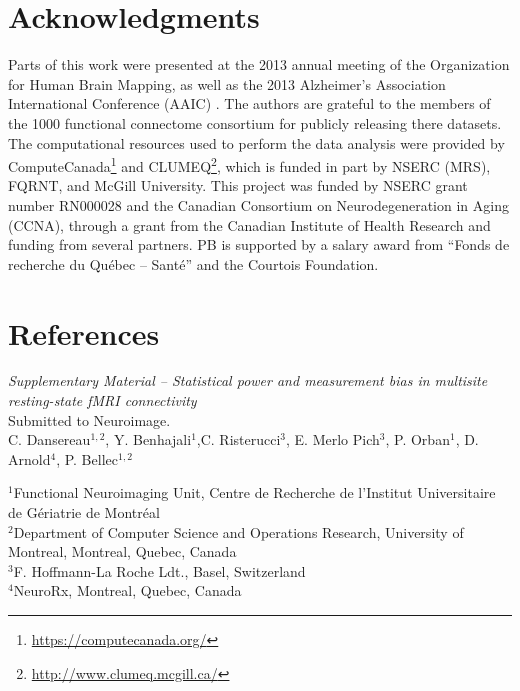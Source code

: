 \documentclass[authoryear]{elsarticle}
\begin{document}
\section{Acknowledgments}
Parts of this work were presented at the 2013 annual meeting of the Organization for Human Brain Mapping, as well as the 2013 Alzheimer's Association International Conference (AAIC) \citep{Dansereau2013b}. The authors are grateful to the members of the 1000 functional connectome consortium for publicly releasing there datasets. The computational resources used to perform the data analysis were provided by ComputeCanada\footnote{\url{https://computecanada.org/}} and CLUMEQ\footnote{\url{http://www.clumeq.mcgill.ca/}}, which is funded in part by NSERC (MRS), FQRNT, and McGill University. This project was funded by NSERC grant number RN000028 and the Canadian
Consortium on Neurodegeneration in Aging (CCNA), through a grant from
the Canadian Institute of Health Research and funding from several
partners. PB is supported by a salary award from ``Fonds de recherche du Qu\'ebec -- Sant\'e'' and the Courtois Foundation.

\section*{References}





\pagebreak



\clearpage
\appendix


\clearpage
\pagebreak
\renewcommand{\thefigure}{S\arabic{figure}}
\renewcommand{\thetable}{S\arabic{table}}
\setcounter{figure}{0}
\begin{center}
\emph{Supplementary Material {--} Statistical power and measurement bias in multisite resting-state fMRI connectivity}\\

\vspace{\baselineskip}Submitted to Neuroimage.\\

\vspace{\baselineskip}C. Dansereau$^{1,2}$,  Y. Benhajali$^{1}$,C. Risterucci$^{3}$, E. Merlo Pich$^{3}$, P. Orban$^{1}$, D. Arnold$^{4}$, P. Bellec$^{1,2}$\\

\end{center}
$^1$Functional Neuroimaging Unit, Centre de Recherche de l'Institut Universitaire de G\'eriatrie de Montr\'eal\\
$^2$Department of Computer Science and Operations Research, University of Montreal, Montreal, Quebec, Canada\\
$^3$F. Hoffmann-La Roche Ldt., Basel, Switzerland\\
$^4$NeuroRx, Montreal, Quebec, Canada\\
\end{document}

